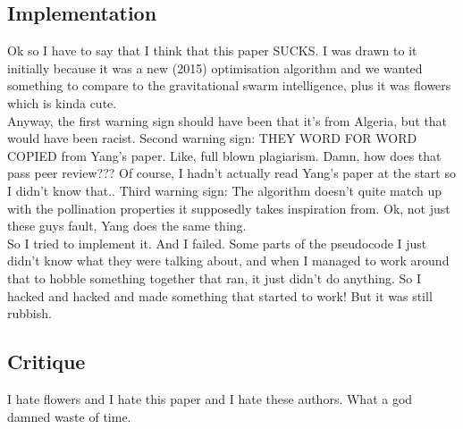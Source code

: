 \subsection{Implementation}

Ok so I have to say that I think that this paper\cite{7175923} SUCKS. I was drawn to it initially because it was a new (2015) optimisation algorithm and we wanted something to compare to the gravitational swarm intelligence\cite{bib:GravSwarm}, plus it was flowers which is kinda cute.\\
Anyway, the first warning sign should have been that it's from Algeria, but that would have been racist. Second warning sign: THEY WORD FOR WORD COPIED from Yang's paper. Like, full blown plagiarism. Damn, how does that pass peer review??? Of course, I hadn't actually read Yang's paper at the start so I didn't know that.. Third warning sign: The algorithm doesn't quite match up with the pollination properties it supposedly takes inspiration from. Ok, not just these guys fault, Yang does the same thing.\\
So I tried to implement it. And I failed. Some parts of the pseudocode I just didn't know what they were talking about, and when I managed to work around that to hobble something together that ran, it just didn't do anything. So I hacked and hacked and made something that started to work! But it was still rubbish.

\subsection{Critique}
I hate flowers and I hate this paper and I hate these authors. What a god damned waste of time.


